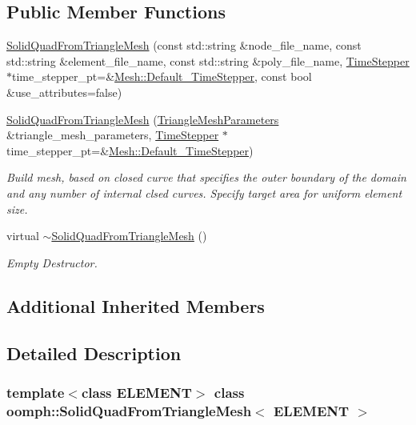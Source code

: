 \subsection*{Public Member Functions}
\begin{DoxyCompactItemize}
\item 
\hyperlink{classoomph_1_1SolidQuadFromTriangleMesh_ad4bc87ca77ca074e6153c383d04c1499}{Solid\+Quad\+From\+Triangle\+Mesh} (const std\+::string \&node\+\_\+file\+\_\+name, const std\+::string \&element\+\_\+file\+\_\+name, const std\+::string \&poly\+\_\+file\+\_\+name, \hyperlink{classoomph_1_1TimeStepper}{Time\+Stepper} $\ast$time\+\_\+stepper\+\_\+pt=\&\hyperlink{classoomph_1_1Mesh_a12243d0fee2b1fcee729ee5a4777ea10}{Mesh\+::\+Default\+\_\+\+Time\+Stepper}, const bool \&use\+\_\+attributes=false)
\item 
\hyperlink{classoomph_1_1SolidQuadFromTriangleMesh_a2840a2b887344189d0921c9d6ff2cf63}{Solid\+Quad\+From\+Triangle\+Mesh} (\hyperlink{classoomph_1_1TriangleMeshParameters}{Triangle\+Mesh\+Parameters} \&triangle\+\_\+mesh\+\_\+parameters, \hyperlink{classoomph_1_1TimeStepper}{Time\+Stepper} $\ast$time\+\_\+stepper\+\_\+pt=\&\hyperlink{classoomph_1_1Mesh_a12243d0fee2b1fcee729ee5a4777ea10}{Mesh\+::\+Default\+\_\+\+Time\+Stepper})
\begin{DoxyCompactList}\small\item\em Build mesh, based on closed curve that specifies the outer boundary of the domain and any number of internal clsed curves. Specify target area for uniform element size. \end{DoxyCompactList}\item 
virtual \hyperlink{classoomph_1_1SolidQuadFromTriangleMesh_af9aaccc5a15dfefab81b91b059217aa3}{$\sim$\+Solid\+Quad\+From\+Triangle\+Mesh} ()
\begin{DoxyCompactList}\small\item\em Empty Destructor. \end{DoxyCompactList}\end{DoxyCompactItemize}
\subsection*{Additional Inherited Members}


\subsection{Detailed Description}
\subsubsection*{template$<$class E\+L\+E\+M\+E\+NT$>$\newline
class oomph\+::\+Solid\+Quad\+From\+Triangle\+Mesh$<$ E\+L\+E\+M\+E\+N\+T $>$}

